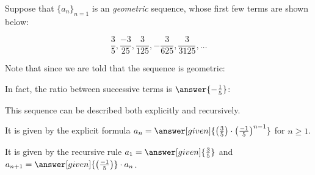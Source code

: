 \documentclass{ximera}
\author{Jim Talamo and Bart Snapp}
\begin{document}
\begin{exercise}

Suppose that $\{a_n\}_{n=1}$ is an \emph{geometric} sequence, whose first few terms are shown below:

\[
\frac{3}{5}, \frac{-3}{25}, \frac{3}{125}, -\frac{3}{625}, \frac{3}{3125}, \ldots
\]

Note that since we are told that the sequence is geometric:

\begin{multipleChoice}
\end{multipleChoice}

In fact, the ratio between successive terms is $\answer{-\frac{1}{5}}$:

\begin{exercise}

  \begin{image}
  \end{image}
  This sequence can be described both explicitly and recursively.
  
  It is given by the explicit formula $a_n=\answer[given]{\left(\frac{3}{5}\right)\cdot
    \left(\frac{-1}{5}\right)^{n-1}}$ for $n \geq 1$.
    
    It is given by the recursive rule $a_1 = \answer[given]{\frac{3}{5}}$ and
  $a_{n+1} = \answer[given]{\left(\frac{-1}{5}\right)}\cdot a_n$. 
  
\end{exercise}
\end{exercise}
\end{document}
